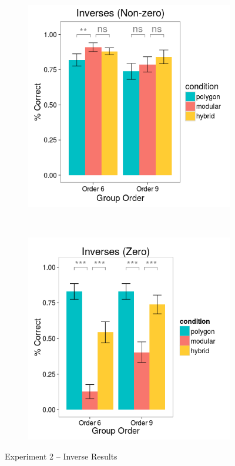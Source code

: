 \documentclass[11pt]{article}
\begin{document}
\begin{figure}[h]
\centering
\begin{subfigure}[c]{0.4\textwidth}
\centering
\includegraphics[width=\textwidth]{figures/2/in_NZ_r.png}
\end{subfigure}
~
\begin{subfigure}[c]{0.4\textwidth}
\centering
\includegraphics[width=\textwidth]{figures/2/in_Z_r.png}
\end{subfigure}
\caption{Experiment 2 -- Inverse Results}
\label{ex2_in}
\end{figure} 
\end{document}
